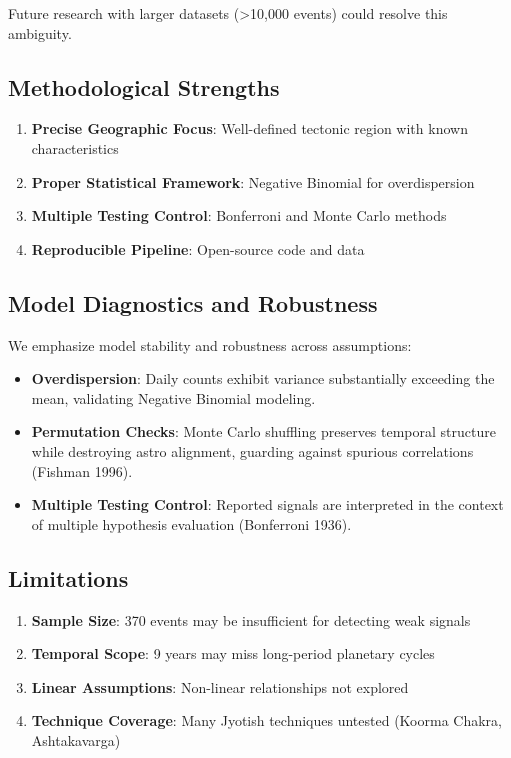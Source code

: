 \documentclass[
  11pt,
  a4paper,
  oneside,
  openany]{article}
\providecommand{\tightlist}{%
  \setlength{\itemsep}{0pt}\setlength{\parskip}{0pt}}\usepackage{longtable,booktabs,array}
\begin{document}
Future research with larger datasets (\textgreater10,000 events) could
resolve this ambiguity.

\subsection{Methodological Strengths}\label{methodological-strengths}

\begin{enumerate}
\def\labelenumi{\arabic{enumi}.}
\tightlist
\item
  \textbf{Precise Geographic Focus}: Well-defined tectonic region with
  known characteristics
\item
  \textbf{Proper Statistical Framework}: Negative Binomial for
  overdispersion
\item
  \textbf{Multiple Testing Control}: Bonferroni and Monte Carlo methods
\item
  \textbf{Reproducible Pipeline}: Open-source code and data
\end{enumerate}

\subsection{Model Diagnostics and
Robustness}\label{model-diagnostics-and-robustness}

We emphasize model stability and robustness across assumptions:

\begin{itemize}
\tightlist
\item
  \textbf{Overdispersion}: Daily counts exhibit variance substantially
  exceeding the mean, validating Negative Binomial modeling.
\item
  \textbf{Permutation Checks}: Monte Carlo shuffling preserves temporal
  structure while destroying astro alignment, guarding against spurious
  correlations (Fishman 1996).
\item
  \textbf{Multiple Testing Control}: Reported signals are interpreted in
  the context of multiple hypothesis evaluation (Bonferroni 1936).
\end{itemize}

\subsection{Limitations}\label{limitations-1}

\begin{enumerate}
\def\labelenumi{\arabic{enumi}.}
\tightlist
\item
  \textbf{Sample Size}: 370 events may be insufficient for detecting
  weak signals
\item
  \textbf{Temporal Scope}: 9 years may miss long-period planetary cycles
\item
  \textbf{Linear Assumptions}: Non-linear relationships not explored
\item
  \textbf{Technique Coverage}: Many Jyotish techniques untested (Koorma
  Chakra, Ashtakavarga)
\end{enumerate}
\end{document}
